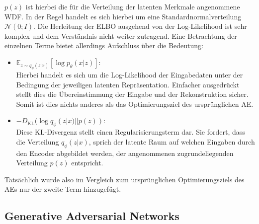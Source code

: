 $p(z)$ ist hierbei die für die Verteilung der latenten Merkmale angenommene \ac{WDF}. In der Regel handelt es sich hierbei um eine Standardnormalverteilung $\mathcal N(0; I)$. Die Herleitung der \ac{ELBO} ausgehend von der Log-Likelihood ist sehr komplex und dem Verständnis nicht weiter zutragend. Eine Betrachtung der einzelnen Terme bietet allerdings Aufschluss über die Bedeutung:
\begin{itemize}
    \item $\mathbb E_{z \sim q_{\phi}(z|x)}
        \left [
            \log p_\theta(x|z)
        \right ]$: \\
    Hierbei handelt es sich um die Log-Likelihood der Eingabedaten unter der Bedingung der jeweiligen latenten Repräsentation. Einfacher ausgedrückt stellt dies die Übereinstimmung der Eingabe und der Rekonstruktion sicher. Somit ist dies nichts anderes als das Optimierungsziel des ursprünglichen \ac{AE}.

    \item $-D_\text{KL} (\log q_{\phi}(z|x) || p(z))$: \\
    Diese KL-Divergenz stellt einen Regularisierungsterm dar. Sie fordert, dass die Verteilung $q_{\phi}(z|x)$, sprich der latente Raum auf welchen Eingaben durch den Encoder abgebildet werden, der angenommenen zugrundeliegenden Verteilung $p(z)$ entspricht.
\end{itemize}
Tatsächlich wurde also im Vergleich zum ursprünglichen Optimierungsziels des \ac{AE}s nur der zweite Term hinzugefügt.


\subsection{Generative Adversarial Networks}

